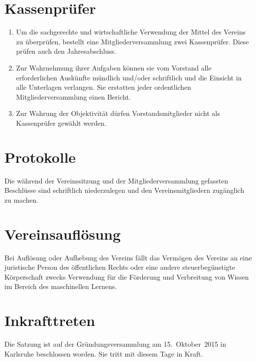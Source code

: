 \documentclass[a4paper]{scrartcl}
\newcommand\Gruendungsdatum{15.~Oktober~2015}
\begin{document}
\section{Kassenprüfer}
\begin{enumerate}
    \item Um die sachgerechte und wirtschaftliche Verwendung der Mittel des
          Vereins zu überprüfen, bestellt eine Mitgliederversammlung zwei
          Kassenprüfer. Diese prüfen auch den Jahresabschluss.
    \item Zur Wahrnehmung ihrer Aufgaben können sie vom Vorstand alle
          erforderlichen Auskünfte mündlich und/oder schriftlich und die
          Einsicht in alle Unterlagen verlangen. Sie erstatten jeder
          ordentlichen Mitgliederversammlung einen Bericht.
    \item Zur Wahrung der Objektivität dürfen Vorstandsmitglieder nicht als
          Kassenprüfer gewählt werden.
\end{enumerate}

\section{Protokolle}
Die während der Vereinssitzung und der Mitgliederversammlung gefassten
Beschlüsse sind schriftlich niederzulegen und den Vereinsmitgliedern
zugänglich zu machen.

\section{Vereinsauflösung}
Bei Auflösung oder Aufhebung des Vereins fällt das Vermögen
des Vereins an eine juristische Person des öffentlichen Rechts
oder eine andere steuerbegünstigte Körperschaft zwecks Verwendung
für die Förderung und Verbreitung von Wissen im Bereich
des maschinellen Lernens.

\section{Inkrafttreten}
Die Satzung ist auf der Gründungsversammlung am \Gruendungsdatum{} in Karlsruhe
beschlossen worden. Sie tritt mit diesem Tage in Kraft.

\end{document}
